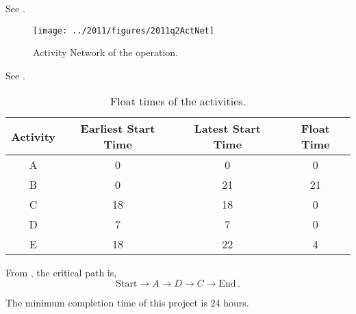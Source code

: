 \begin{subquestions}
\subquestion

\begin{subsubquestions}
	
\subsubquestion

See .
\begin{figure}
	\begin{center}
		\texttt{[image: ../2011/figures/2011q2ActNet]}
		\caption{\label{2011:q2:fig:ActNet} Activity Network of the operation.}
	\end{center}
\end{figure}


\subsubquestion

See .
\begin{table}[ht]
	\centering
	\begin{tabular}{|c|c|c|c|}
		\hline
		Activity & Earliest Start Time & Latest Start Time & Float Time \\
		\hline
		A & 0 & 0 & 0 \\
		B & 0 & 21 & 21 \\
		C & 18 & 18 & 0 \\
		D & 7 & 7 & 0 \\
		E & 18 & 22 & 4 \\
		\hline
	\end{tabular}
	\caption{\label{2011:q2:tab:Table1} Float times of the activities.}
\end{table}
	

\subsubquestion

\begin{subsubsubquestions}
	
\subsubsubquestion

From , the critical path is,
\begin{equation}
	\text{Start} \rightarrow A \rightarrow D \rightarrow C \rightarrow \text{End}\,.
\end{equation}


\subsubsubquestion

The minimum completion time of this project is 24 hours.

\end{subsubsubquestions}

\end{subsubquestions}

\end{subquestions}


